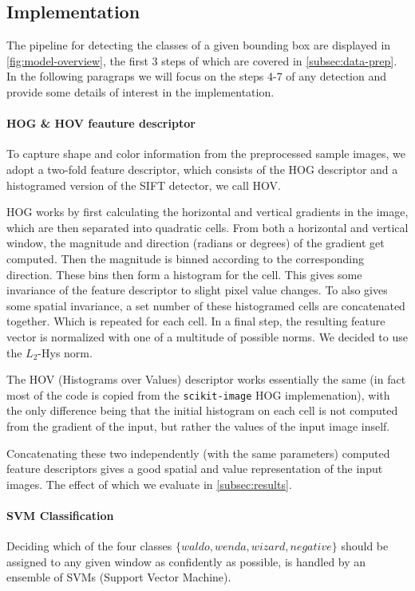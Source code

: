 \documentclass[11pt]{article}
\begin{document}
\subsection{Implementation}\label{subsec:implementation}

The pipeline for detecting the classes of a given bounding box are displayed in \autoref{fig:model-overview},
the first 3 steps of which are covered in \autoref{subsec:data-prep}. In the following paragraps we will focus on the
steps 4-7 of any detection and provide some details of interest in the implementation.

\paragraph{HOG \& HOV feauture descriptor}
To capture shape and color information from the preprocessed sample images, we adopt a two-fold feature descriptor, 
which consists of the HOG descriptor and a histogramed version of the SIFT detector, we call HOV.

HOG works by first calculating the horizontal and vertical gradients in the image, which are then separated into
quadratic cells. From both a horizontal and vertical window, the magnitude and direction (radians or degrees) of the gradient get computed.
Then the magnitude is binned according to the corresponding direction. These bins then form a histogram for the cell.
This gives some invariance of the feature descriptor to slight pixel value changes. 
To also gives some spatial invariance, a set number of these histogramed cells are concatenated together. Which is repeated for each cell.
In a final step, the resulting feature vector is normalized with one of a multitude of possible norms. We decided to use the \( L_2 \)-Hys norm.

The HOV (Histograms over Values) descriptor works essentially the same (in fact most of the code is copied from the \verb|scikit-image| HOG implemenation),
with the only difference being that the initial histogram on each cell is not computed from the gradient of the input,
but rather the values of the input image inself.

Concatenating these two independently (with the same parameters) computed feature descriptors gives a good spatial and
value representation of the input images. The effect of which we evaluate in \autoref{subsec:results}.


\paragraph{SVM Classification}
Deciding which of the four classes \( \{waldo, wenda, wizard, negative \} \) should be assigned to any given window 
as confidently as possible, is handled by an ensemble of SVMs (Support Vector Machine)\cite{Hearst:1998:SVM:630302.630387}.
\end{document}
